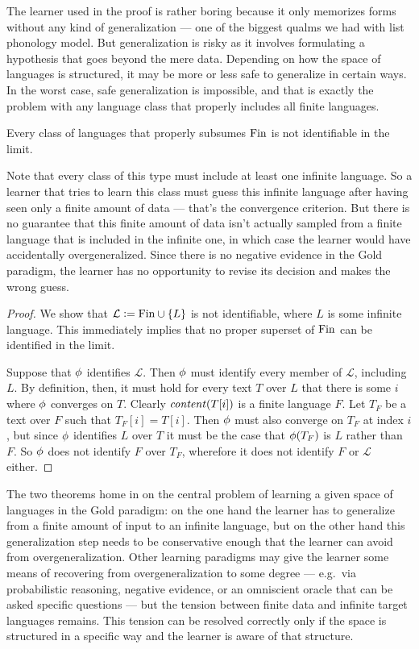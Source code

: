 The learner used in the proof is rather boring because it only memorizes forms without any kind of generalization --- one of the biggest qualms we had with list phonology model.
But generalization is risky as it involves formulating a hypothesis that goes beyond the mere data.
Depending on how the space of languages is structured, it may be more or less safe to generalize in certain ways.
In the worst case, safe generalization is impossible, and that is exactly the problem with any language class that properly includes all finite languages.
%
\begin{theorem}
    Every class of languages that properly subsumes $\mathrm{Fin}$ is not identifiable in the limit.
\end{theorem}
%
Note that every class of this type must include at least one infinite language.
So a learner that tries to learn this class must guess this infinite language after having seen only a finite amount of data --- that's the convergence criterion.
But there is no guarantee that this finite amount of data isn't actually sampled from a finite language that is included in the infinite one, in which case the learner would have accidentally overgeneralized.
Since there is no negative evidence in the Gold paradigm, the learner has no opportunity to revise its decision and makes the wrong guess.
%
\begin{proof}
    We show that $\mathcal{L} \mathrel{\mathop:}= \mathrm{Fin} \cup \left \{ L \right \}$ is not identifiable, where $L$ is some infinite language.
    This immediately implies that no proper superset of $\mathrm{Fin}$ can be identified in the limit.

    Suppose that $\phi$ identifies $\mathcal{L}$.
    Then $\phi$ must identify every member of $\mathcal{L}$, including $L$.
    By definition, then, it must hold for every text $T$ over $L$ that there is some $i$ where $\phi$ converges on $T$.
    Clearly $\mathit{content}(T[i])$ is a finite language $F$.
    Let $T_F$ be a text over $F$ such that $T_F[i] = T[i]$.
    Then $\phi$ must also converge on $T_F$ at index $i$, but since $\phi$ identifies $L$ over $T$ it must be the case that $\phi(T_F)$ is $L$ rather than $F$.
    So $\phi$ does not identify $F$ over $T_F$, wherefore it does not identify $F$ or $\mathcal{L}$ either.
\end{proof}

The two theorems home in on the central problem of learning a given space of languages in the Gold paradigm: on the one hand the learner has to generalize from a finite amount of input to an infinite language, but on the other hand this generalization step needs to be conservative enough that the learner can avoid from overgeneralization.
Other learning paradigms may give the learner some means of recovering from overgeneralization to some degree --- e.g.\ via probabilistic reasoning, negative evidence, or an omniscient oracle that can be asked specific questions --- but the tension between finite data and infinite target languages remains.
This tension can be resolved correctly only if the space is structured in a specific way and the learner is aware of that structure.


